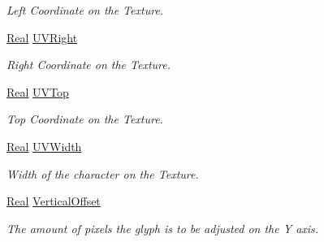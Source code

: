\begin{DoxyCompactItemize}
\begin{DoxyCompactList}\small\item\em Left Coordinate on the Texture. \item\end{DoxyCompactList}\item 
\hypertarget{classMezzanine_1_1UI_1_1Glyph_a57cd0fafe97e0d8a272c54874cce951e}{
\hyperlink{namespaceMezzanine_a726731b1a7df72bf3583e4a97282c6f6}{Real} \hyperlink{classMezzanine_1_1UI_1_1Glyph_a57cd0fafe97e0d8a272c54874cce951e}{UVRight}}
\label{classMezzanine_1_1UI_1_1Glyph_a57cd0fafe97e0d8a272c54874cce951e}

\begin{DoxyCompactList}\small\item\em Right Coordinate on the Texture. \item\end{DoxyCompactList}\item 
\hypertarget{classMezzanine_1_1UI_1_1Glyph_ae6f5fa30782e6710e3cc69328c49b2f8}{
\hyperlink{namespaceMezzanine_a726731b1a7df72bf3583e4a97282c6f6}{Real} \hyperlink{classMezzanine_1_1UI_1_1Glyph_ae6f5fa30782e6710e3cc69328c49b2f8}{UVTop}}
\label{classMezzanine_1_1UI_1_1Glyph_ae6f5fa30782e6710e3cc69328c49b2f8}

\begin{DoxyCompactList}\small\item\em Top Coordinate on the Texture. \item\end{DoxyCompactList}\item 
\hypertarget{classMezzanine_1_1UI_1_1Glyph_abe914a999722ba3d3c46e63bc4af0627}{
\hyperlink{namespaceMezzanine_a726731b1a7df72bf3583e4a97282c6f6}{Real} \hyperlink{classMezzanine_1_1UI_1_1Glyph_abe914a999722ba3d3c46e63bc4af0627}{UVWidth}}
\label{classMezzanine_1_1UI_1_1Glyph_abe914a999722ba3d3c46e63bc4af0627}

\begin{DoxyCompactList}\small\item\em Width of the character on the Texture. \item\end{DoxyCompactList}\item 
\hypertarget{classMezzanine_1_1UI_1_1Glyph_a86253fccb2e04a6096aaff81c6657409}{
\hyperlink{namespaceMezzanine_a726731b1a7df72bf3583e4a97282c6f6}{Real} \hyperlink{classMezzanine_1_1UI_1_1Glyph_a86253fccb2e04a6096aaff81c6657409}{VerticalOffset}}
\label{classMezzanine_1_1UI_1_1Glyph_a86253fccb2e04a6096aaff81c6657409}

\begin{DoxyCompactList}\small\item\em The amount of pixels the glyph is to be adjusted on the Y axis. \item\end{DoxyCompactList}\end{DoxyCompactItemize}


